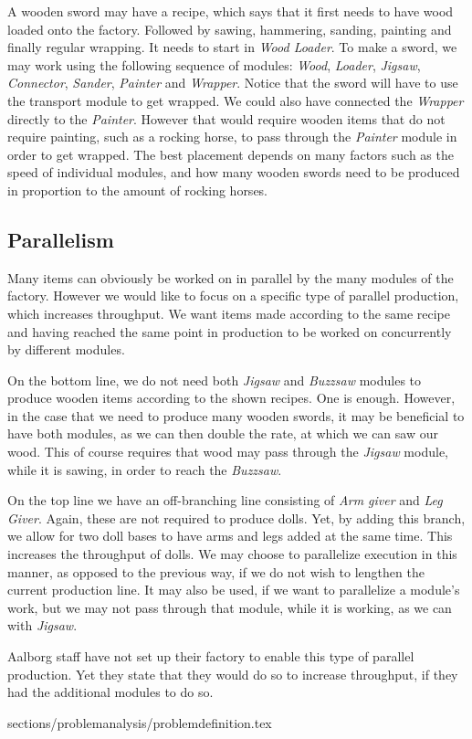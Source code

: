A wooden sword may have a recipe, which says that it first needs to have wood loaded onto the factory. Followed by sawing, hammering, sanding, painting and finally regular wrapping. It needs to start in \textit{Wood Loader}. To make a sword, we may work using the following sequence of modules: \textit{Wood}, \textit{Loader}, \textit{Jigsaw}, \textit{Connector}, \textit{Sander}, \textit{Painter} and \textit{Wrapper}. Notice that the sword will have to use the transport module to get wrapped. We could also have connected the \textit{Wrapper} directly to the \textit{Painter}. However that would require wooden items that do not require painting, such as a rocking horse, to pass through the \textit{Painter} module in order to get wrapped. The best placement depends on many factors such as the speed of individual modules, and how many wooden swords need to be produced in proportion to the amount of rocking horses.

\subsection{Parallelism}
Many items can obviously be worked on in parallel by the many modules of the factory. However we would like to focus on a specific type of parallel production, which increases throughput. We want items made according to the same recipe and having reached the same point in production to be worked on concurrently by different modules.  

On the bottom line, we do not need both \textit{Jigsaw} and \textit{Buzzsaw} modules to produce wooden items according to the shown recipes. One is enough. However, in the case that we need to produce many wooden swords, it may be beneficial to have both modules, as we can then double the rate, at which we can saw our wood. This of course requires that wood may pass through the \textit{Jigsaw} module, while it is sawing, in order to reach the \textit{Buzzsaw}.

On the top line we have an off-branching line consisting of \textit{Arm giver} and \textit{Leg Giver}. Again, these are not required to produce dolls. Yet, by adding this branch, we allow for two doll bases to have arms and legs added at the same time. This increases the throughput of dolls. We may choose to parallelize execution in this manner, as opposed to the previous way, if we do not wish to lengthen the current production line. It may also be used, if we want to parallelize a module's work, but we may not pass through that module, while it is working, as we can with \textit{Jigsaw}.

Aalborg staff have not set up their factory to enable this type of parallel production. Yet they state that they would do so to increase throughput, if they had the additional modules to do so. 

 {sections/problemanalysis/problemdefinition.tex}

